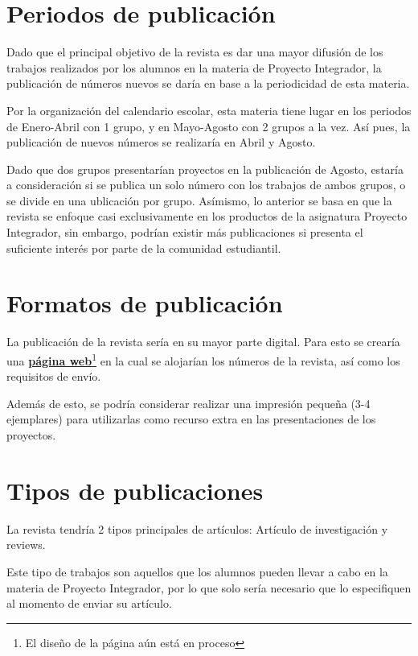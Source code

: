 \documentclass{Manual}
\begin{document}
\section{Periodos de publicación}

Dado que el principal objetivo de la revista es dar una mayor difusión de los trabajos realizados por los alumnos en la materia de Proyecto Integrador, la publicación de números nuevos se daría en base a la periodicidad de esta materia.

Por la organización del calendario escolar, esta materia tiene lugar en los periodos de Enero-Abril con 1 grupo, y en Mayo-Agosto con 2 grupos a la vez. Así pues, la publicación de nuevos números se realizaría en Abril y Agosto.

Dado que dos grupos presentarían proyectos en la publicación de Agosto, estaría a consideración si se publica un solo número con los trabajos de ambos grupos, o se divide en una ublicación por grupo. Asímismo, lo anterior se basa en que la revista se enfoque casi exclusivamente en los productos de la asignatura Proyecto Integrador, sin embargo, podrían existir más publicaciones si presenta el suficiente interés por parte de la comunidad estudiantil.

\section{Formatos de publicación}

La publicación de la revista sería en su mayor parte digital. Para esto se crearía una \textbf{\href{https://darahraccoon.github.io/BT_Magazine/}{página web}}\footnote{El diseño de la página aún está en proceso} en la cual se alojarían los números de la revista, así como los requisitos de envío.

Además de esto, se podría considerar realizar una impresión pequeña (3-4 ejemplares) para utilizarlas como recurso extra en las presentaciones de los proyectos.

\section{Tipos de publicaciones}

La revista tendría 2 tipos principales de artículos: Artículo de investigación y reviews.

Este tipo de trabajos son aquellos que los alumnos pueden llevar a cabo en la materia de Proyecto Integrador, por lo que solo sería necesario que lo especifiquen al momento de enviar su artículo.
\end{document}
